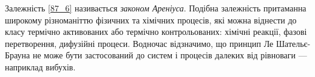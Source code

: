 Залежність \eqref{87_6} називається \emph{законом Ареніуса}. Подібна залежність притаманна широкому різноманіттю фізичних та хімічних процесів, які можна віднести до класу термічно активованих або термічно контрольованих: хімічні реакції, фазові перетворення, дифузійні процеси. Водночас відзначимо, що принцип Ле Шательє-Брауна не може бути застосований до систем і процесів далеких від рівноваги --- наприклад вибухів.

